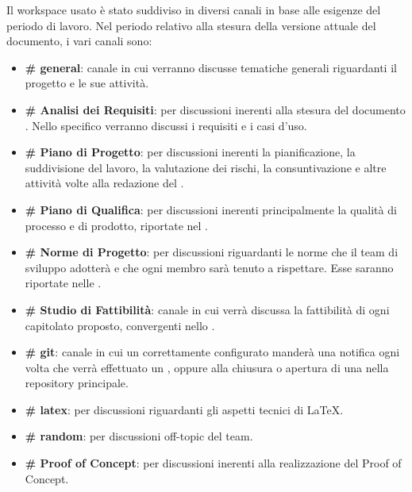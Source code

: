 			Il workspace usato è stato suddiviso in diversi canali in base alle esigenze del periodo di lavoro.
			Nel periodo relativo alla stesura della versione attuale del documento, i vari canali sono:
			\begin{itemize}
				\item \textbf{\# general}: canale in cui verranno discusse tematiche generali riguardanti il progetto e le sue attività.
				\item \textbf{\# Analisi dei Requisiti}: per discussioni inerenti alla stesura del documento \AdR. Nello specifico verranno discussi i requisiti e i casi d'uso.
				\item \textbf{\# Piano di Progetto}: per discussioni inerenti la pianificazione, la suddivisione del lavoro, la valutazione dei rischi, la consuntivazione e altre attività volte alla redazione del \PdP.
				\item \textbf{\# Piano di Qualifica}: per discussioni inerenti principalmente la qualità di processo e di prodotto, riportate nel \PdQ.
				\item \textbf{\# Norme di Progetto}: per discussioni riguardanti le norme che il team di sviluppo adotterà e che ogni membro sarà tenuto a rispettare. Esse saranno riportate nelle \NdP.
				\item \textbf{\# Studio di Fattibilità}: canale in cui verrà discussa la fattibilità di ogni capitolato proposto, convergenti nello \SdF.
				\item \textbf{\# git}: canale in cui un  correttamente configurato manderà una notifica ogni volta che verrà effettuato un , oppure alla chiusura o apertura di una  nella repository principale.
				\item \textbf{\# latex}: per discussioni riguardanti gli aspetti tecnici di \LaTeX.
				\item \textbf{\# random}: per discussioni off-topic del team.
				\item \textbf{\# Proof of Concept}: per discussioni inerenti alla realizzazione del Proof of Concept.
			\end{itemize}

